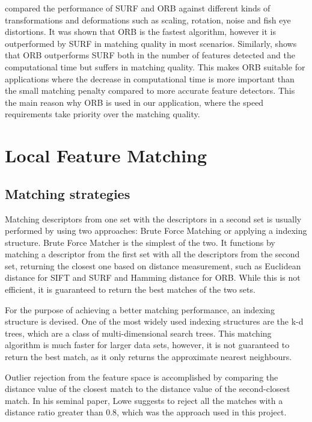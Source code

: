 \documentclass{l4proj}
\begin{document}
\citet{Karami} compared the performance of SURF and ORB against different kinds of transformations and deformations such as scaling, rotation, noise and fish eye distortions. It was shown that ORB is the fastest algorithm, however it is outperformed by SURF in matching quality in most scenarios. Similarly, \citet{Tareen2018ACA} shows that ORB outperforms SURF both in the number of features detected and the computational time but suffers in matching quality. This makes ORB suitable for applications where the decrease in computational time is more important than the small matching penalty compared to more accurate feature detectors. This the main reason why ORB is used in our application, where the speed requirements take priority over the matching quality. 


\section{Local Feature Matching}

\subsection{Matching strategies}
Matching descriptors from one set with the descriptors in a second set is usually performed by using two approaches: Brute Force Matching or applying a indexing structure. Brute Force Matcher is the simplest of the two. It functions by matching a descriptor from the first set with all the descriptors from the second set, returning the closest one based on distance measurement, such as Euclidean distance for SIFT and SURF and Hamming distance for ORB. While this is not efficient, it is guaranteed to return the best matches of the two sets. 

For the purpose of achieving a better matching performance, an indexing structure is devised. One of the most widely used indexing structures are the k-d trees, which are a class of multi-dimensional search trees. This matching algorithm is much faster for larger data sets, however, it is not guaranteed to return the best match, as it only returns the approximate nearest neighbours. 

Outlier rejection from the feature space is accomplished by comparing the distance value of the closest match to the distance value of the second-closest match. In his seminal paper, Lowe suggests to reject all the matches with a distance ratio greater than 0.8, which was the approach used in this project. 
\end{document}
